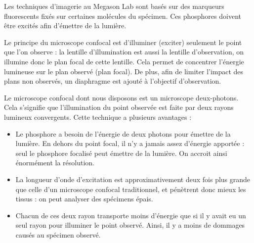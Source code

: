 Les techniques d'imagerie au Megason Lab sont basés sur des marqueurs fluorescents fixés sur certaines molécules du spécimen. Ces phosphores doivent être excités afin d'émettre de la lumière.

Le principe du microscope confocal est d'illuminer (exciter) seulement le point que l'on observe : la lentille d'illumination est aussi la lentille d'observation, on illumine donc le plan focal de cette lentille. Cela permet de concentrer l'énergie lumineuse sur le plan observé (plan focal). De plus, afin de limiter l'impact des plans non observés, un diaphragme est ajouté à l'objectif d'observation.

Le microscope confocal dont nous disposons est un microscope deux-photons.
Cela s'signifie que l'illumination du point observée est faite par deux rayons lumineux convergents.
Cette technique a plusieurs avantages :
\begin{itemize}
  \item Le phosphore a besoin de l'énergie de deux photons pour émettre de la lumière. En dehors du point focal, il n'y a jamais assez d'énergie apportée : seul le phosphore focalisé peut émettre de la lumière. On accroit ainsi énormément la résolution.
  \item La longueur d'onde d'excitation est approximativement deux fois plus grande que celle d'un microscope confocal traditionnel, et pénètrent donc mieux les tissus : on peut analyser des spécimens épais.
  \item Chacun de ces deux rayon transporte moins d'énergie que si il y avait eu un seul rayon pour illuminer le point observé.
  Ainsi, il y a moins de dommages causés au spécimen observé.
\end{itemize}

%
% 


